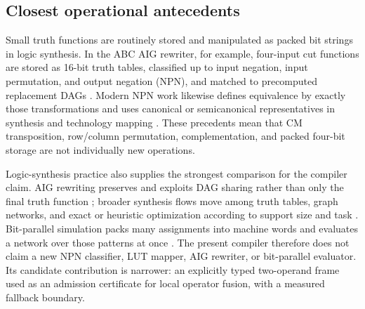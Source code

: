 \documentclass[11pt]{article}
\begin{document}
{\subsection{Closest operational antecedents}

Small truth functions are routinely stored and manipulated as packed bit
strings in logic synthesis. In the ABC AIG rewriter, for example, four-input
cut functions are stored as 16-bit truth tables, classified up to input
negation, input permutation, and output negation (NPN), and matched to
precomputed replacement DAGs \citep{mishchenko2006}. Modern NPN work likewise
defines equivalence by exactly those transformations and uses canonical or
semicanonical representatives in synthesis and technology mapping
\citep{zhou2019}. These precedents mean that CM transposition, row/column
permutation, complementation, and packed four-bit storage are not individually
new operations.

Logic-synthesis practice also supplies the strongest comparison for the
compiler claim. AIG rewriting preserves and exploits DAG sharing rather than
only the final truth function \citep{mishchenko2006}; broader synthesis flows
move among truth tables, graph networks, and exact or heuristic optimization
according to support size and task \citep{testa2019}. Bit-parallel simulation
packs many assignments into machine words and evaluates a network over those
patterns at once \citep{lee2022}. The present compiler therefore does not
claim a new NPN classifier, LUT mapper, AIG rewriter, or bit-parallel evaluator.
Its candidate contribution is narrower: an explicitly typed two-operand frame
used as an admission certificate for local operator fusion, with a measured
fallback boundary.

}
\end{document}
